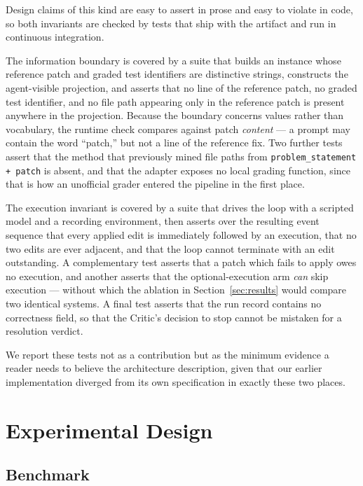 \documentclass[journal]{IEEEtran}
\begin{document}
Design claims of this kind are easy to assert in prose and easy to violate in code, so both invariants are checked by tests that ship with the artifact and run in continuous integration.

The information boundary is covered by a suite that builds an instance whose reference patch and graded test identifiers are distinctive strings, constructs the agent-visible projection, and asserts that no line of the reference patch, no graded test identifier, and no file path appearing only in the reference patch is present anywhere in the projection. Because the boundary concerns values rather than vocabulary, the runtime check compares against patch \emph{content} — a prompt may contain the word ``patch,'' but not a line of the reference fix. Two further tests assert that the method that previously mined file paths from \texttt{problem\_statement + patch} is absent, and that the adapter exposes no local grading function, since that is how an unofficial grader entered the pipeline in the first place.

The execution invariant is covered by a suite that drives the loop with a scripted model and a recording environment, then asserts over the resulting event sequence that every applied edit is immediately followed by an execution, that no two edits are ever adjacent, and that the loop cannot terminate with an edit outstanding. A complementary test asserts that a patch which fails to apply owes no execution, and another asserts that the optional-execution arm \emph{can} skip execution — without which the ablation in Section~\ref{sec:results} would compare two identical systems. A final test asserts that the run record contains no correctness field, so that the Critic's decision to stop cannot be mistaken for a resolution verdict.

We report these tests not as a contribution but as the minimum evidence a reader needs to believe the architecture description, given that our earlier implementation diverged from its own specification in exactly these two places.

\section{Experimental Design}
\label{sec:experiments}

\subsection{Benchmark}
\end{document}
